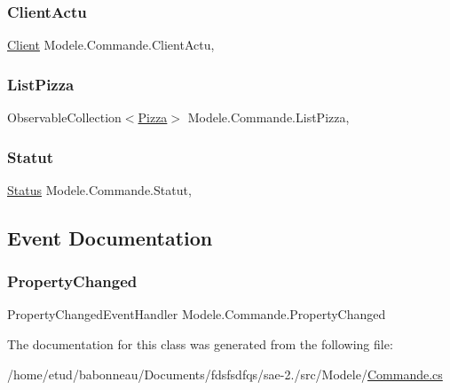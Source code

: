 \subsubsection{\texorpdfstring{Client\+Actu}{ClientActu}}
{\footnotesize\ttfamily \hyperlink{classModele_1_1Client}{Client} Modele.\+Commande.\+Client\+Actu\hspace{0.3cm}{\ttfamily [get]}, {\ttfamily [set]}}

\mbox{\label{classModele_1_1Commande_a296c71bf31f1e6383e63d842ceb0bfe6}} 
\subsubsection{\texorpdfstring{List\+Pizza}{ListPizza}}
{\footnotesize\ttfamily Observable\+Collection$<$\hyperlink{classModele_1_1Pizza}{Pizza}$>$ Modele.\+Commande.\+List\+Pizza\hspace{0.3cm}{\ttfamily [get]}, {\ttfamily [set]}}

\mbox{\label{classModele_1_1Commande_af468b3432c93b1c7929b2af8154386a6}} 
\subsubsection{\texorpdfstring{Statut}{Statut}}
{\footnotesize\ttfamily \hyperlink{namespaceModele_a7de67c7bf55b42ee1c5fea81ed793eb1}{Status} Modele.\+Commande.\+Statut\hspace{0.3cm}{\ttfamily [get]}, {\ttfamily [set]}}



\subsection{Event Documentation}
\mbox{\label{classModele_1_1Commande_a6022a80a486b9612bb124e6fef5a3373}} 
\subsubsection{\texorpdfstring{Property\+Changed}{PropertyChanged}}
{\footnotesize\ttfamily Property\+Changed\+Event\+Handler Modele.\+Commande.\+Property\+Changed}



The documentation for this class was generated from the following file\+:\begin{DoxyCompactItemize}
\item 
/home/etud/babonneau/\+Documents/fdsfsdfqs/sae-\/2./src/\+Modele/\hyperlink{Commande_8cs}{Commande.\+cs}\end{DoxyCompactItemize}
